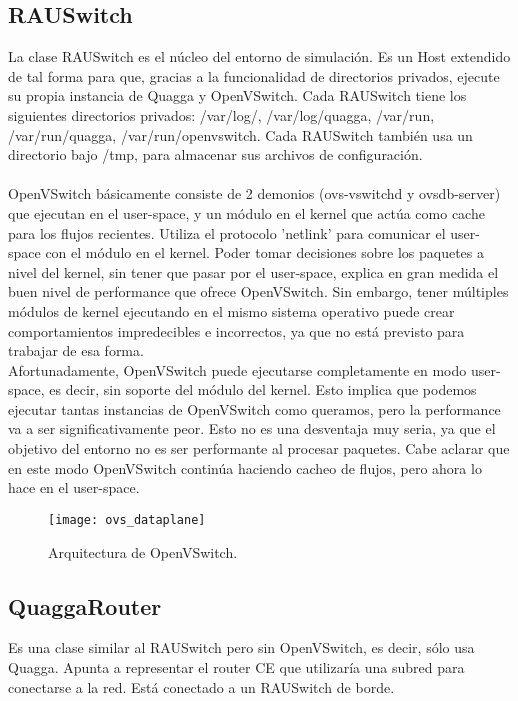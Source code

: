 \subsection{RAUSwitch}
La clase RAUSwitch es el núcleo del entorno de simulación. Es un Host extendido de tal forma para que, gracias a la funcionalidad de directorios privados, ejecute su propia instancia de Quagga y OpenVSwitch. Cada RAUSwitch tiene los siguientes directorios privados: /var/log/, /var/log/quagga, /var/run, /var/run/quagga, /var/run/openvswitch. Cada RAUSwitch también usa un directorio bajo /tmp, para almacenar sus archivos de configuración.\\ \\

OpenVSwitch básicamente consiste de 2 demonios (ovs-vswitchd y ovsdb-server) que ejecutan en el user-space, y un módulo en el kernel que actúa como cache para los flujos recientes. Utiliza el protocolo 'netlink' para comunicar el user-space con el módulo en el kernel. Poder tomar decisiones sobre los paquetes a nivel del kernel, sin tener que pasar por el user-space, explica en gran medida el buen nivel de performance que ofrece OpenVSwitch. Sin embargo, tener múltiples módulos de kernel ejecutando en el mismo sistema operativo puede crear comportamientos impredecibles e incorrectos, ya que no está previsto para trabajar de esa forma.\\
Afortunadamente, OpenVSwitch puede ejecutarse completamente en modo user-space, es decir, sin soporte del módulo del kernel. Esto implica que podemos ejecutar tantas instancias de OpenVSwitch como queramos, pero la performance va a ser significativamente peor. Esto no es una desventaja muy seria, ya que el objetivo del entorno no es ser performante al procesar paquetes. Cabe aclarar que en este modo OpenVSwitch continúa haciendo cacheo de flujos, pero ahora lo hace en el user-space.

\begin{figure}[t]
	\caption{Arquitectura de OpenVSwitch.}
	\texttt{[image: ovs\_dataplane]}
	\centering
	\label{fig:ovs_dataplane}
\end{figure}

\subsection{QuaggaRouter}
Es una clase similar al RAUSwitch pero sin OpenVSwitch, es decir, sólo usa Quagga. Apunta a representar el router CE que utilizaría una subred para conectarse a la red. Está conectado a un RAUSwitch de borde.

